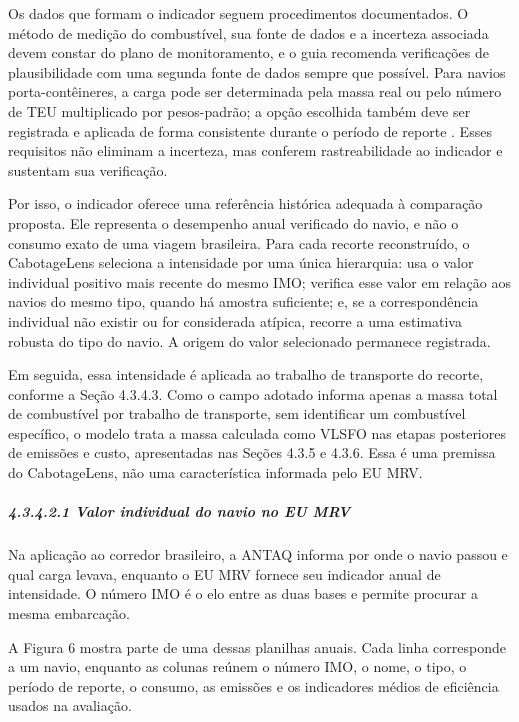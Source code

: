 \documentclass[brazil,]{article}
\let\oldsubparagraph\subparagraph
\renewcommand{\subparagraph}[1]{\Needspace{6\baselineskip}\oldsubparagraph{#1}\mbox{}}
\begin{document}
Os dados que formam o indicador seguem procedimentos documentados. O
método de medição do combustível, sua fonte de dados e a incerteza
associada devem constar do plano de monitoramento, e o guia recomenda
verificações de plausibilidade com uma segunda fonte de dados sempre que
possível. Para navios porta-contêineres, a carga pode ser determinada
pela massa real ou pelo número de TEU multiplicado por pesos-padrão; a
opção escolhida também deve ser registrada e aplicada de forma
consistente durante o período de reporte
\parencite[p. 42, 48--49 e 109--110]{ecmrvguide2025}. Esses requisitos
não eliminam a incerteza, mas conferem rastreabilidade ao indicador e
sustentam sua verificação.

Por isso, o indicador oferece uma referência histórica adequada à
comparação proposta. Ele representa o desempenho anual verificado do
navio, e não o consumo exato de uma viagem brasileira. Para cada recorte
reconstruído, o CabotageLens seleciona a intensidade por uma única
hierarquia: usa o valor individual positivo mais recente do mesmo IMO;
verifica esse valor em relação aos navios do mesmo tipo, quando há
amostra suficiente; e, se a correspondência individual não existir ou
for considerada atípica, recorre a uma estimativa robusta do tipo do
navio. A origem do valor selecionado permanece registrada.

Em seguida, essa intensidade é aplicada ao trabalho de transporte do
recorte, conforme a Seção 4.3.4.3. Como o campo adotado informa apenas a
massa total de combustível por trabalho de transporte, sem identificar
um combustível específico, o modelo trata a massa calculada como VLSFO
nas etapas posteriores de emissões e custo, apresentadas nas Seções
4.3.5 e 4.3.6. Essa é uma premissa do CabotageLens, não uma
característica informada pelo EU MRV.

\hypertarget{valor-individual-do-navio-no-eu-mrv}{%
\subparagraph{4.3.4.2.1 Valor individual do navio no EU
MRV}\label{valor-individual-do-navio-no-eu-mrv}}

Na aplicação ao corredor brasileiro, a ANTAQ informa por onde o navio
passou e qual carga levava, enquanto o EU MRV fornece seu indicador anual
de intensidade. O número IMO é o elo entre as duas bases e permite
procurar a mesma embarcação.

A Figura 6 mostra parte de uma dessas planilhas anuais. Cada linha
corresponde a um navio, enquanto as colunas reúnem o número IMO, o nome,
o tipo, o período de reporte, o consumo, as emissões e os indicadores
médios de eficiência usados na avaliação.
\end{document}
